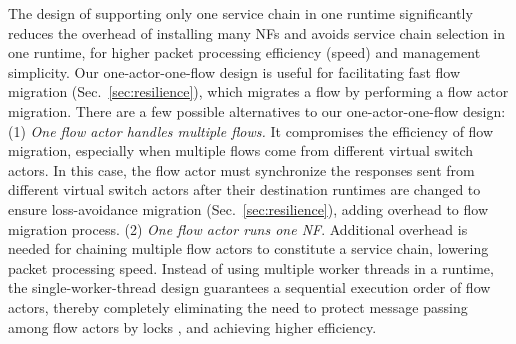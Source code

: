 \vspace{1mm}
 The design of supporting only one service chain in one runtime significantly reduces the overhead of installing many NFs and avoids service chain selection in one runtime, for higher packet processing efficiency (speed) and management simplicity. Our one-actor-one-flow design is useful for facilitating fast flow migration (Sec.~\ref{sec:resilience}), which migrates a flow by performing a flow actor migration.%
 There are a few possible alternatives to our one-actor-one-flow design: (1) {\em One flow actor handles multiple flows.} It compromises the efficiency of flow migration, especially when multiple flows come from different virtual switch actors. In this case, the flow actor must synchronize the responses sent from different virtual switch actors after their destination runtimes are changed to ensure loss-avoidance migration (Sec.~\ref{sec:resilience}), %
 adding overhead to flow migration process.
 (2) {\em One flow actor runs one NF}. Additional overhead is needed for chaining multiple flow actors to constitute a service chain, lowering packet processing speed. %
Instead of using multiple worker threads in a runtime, the single-worker-thread design guarantees a sequential execution order of flow actors, thereby completely eliminating the need to protect message passing among flow actors by locks %
, and achieving higher efficiency.








